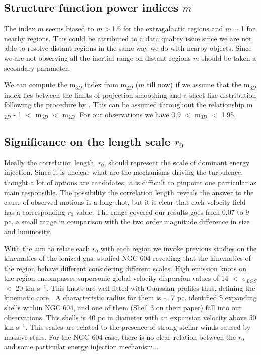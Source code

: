 \documentclass[fleqn,usenatbib, useAMS, a4paper]{mnras}
\begin{document}
\subsection{Structure function power indices \(m\)}

The index \(m\) seems biased to \(m>\)1.6 for the extragalactic regions and \(m\sim\)1 for nearby regions.
This could be attributed to a data quality issue since we are not able to resolve distant regions in the same way we do with nearby objects.
Since we are not observing all the inertial range on distant regions \(m\) should be taken a secondary parameter.

We can compute the m$_{3D}$ index from m$_{2D}$ ($m$ till now) if we assume that the m$_{3D}$ index lies between the limits of projection smoothing and a sheet-like distribution following the procedure by \cite{arthur2016turbulence}.
This can be assumed throughout the relationship m$_{2D}$ - 1 $<$ m$_{3D}$ $<$ m$_{2D}$.
For our observations we have 0.9 $<$ m$_{3D}$ $<$ 1.95.

\subsection{Significance on the length scale \(r_0\)}

Ideally the correlation length, \(r_0\), should represent the scale of dominant energy injection. 
Since it is unclear what are the mechanisms driving the turbulence, thought a lot of options are candidates, it is difficult to pinpoint one particular as main responsible. 
The possibility the correlation length reveals the answer to the cause of observed motions is a long shot, but it is clear that each velocity field has a corresponding \(r_0\) value. 
The range covered our results goes from 0.07 to 9 pc, a small range in comparison with the two order magnitude difference in size and luminosity.

With the aim to relate each \(r_0\) with each region we invoke previous studies on the kinematics of the ionized gas. 
\citet{sabalisck1995supersonic} studied NGC 604 revealing that the kinematics of the region behave different considering different scales.
High emission knots on the region encompasses supersonic global velocity dispersion values of 14 $<$ \(\sigma_{LOS}\) $<$ 20 km s\(^{-1}\).
This knots are well fitted with Gaussian profiles thus, defining the kinematic core \citep{munoz1996}.
A characteristic radius for them is \(\sim\) 7 pc.
\citet{yang1996} identified 5 expanding shells within NGC 604, and one of them (Shell 3 on their paper) fall into our observations.
This shells is 40 pc in diameter with an expansion velocity above 50 km s\(^{-1}\).
This scales are related to the presence of strong stellar winds caused by massive stars.
For the NGC 604 case, there is no clear relation between the \(r_0\) and some particular energy injection mechanism...
\end{document}
